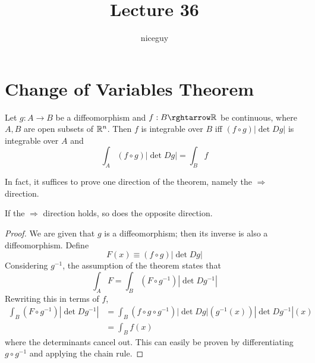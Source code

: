 \documentclass[12pt]{article}
\author{niceguy}
\title{Lecture 36}
\begin{document}
\maketitle

\section{Change of Variables Theorem}

Let $g:A \rightarrow B$ be a diffeomorphism and $f:B \rghtarrow \R$ be continuous, where $A, B$ are open subsets of $\mathbb{R}^n$. Then $f$ is integrable over $B$ iff $(f\circ g) |\det Dg|$ is integrable over $A$ and
$$\int_A (f\circ g) |\det Dg| = \int_B f$$

In fact, it suffices to prove one direction of the theorem, namely the $\Rightarrow$ direction.

\begin{thm}
    If the $\Rightarrow$ direction holds, so does the opposite direction.
\end{thm}

\begin{proof}
    We are given that $g$ is a diffeomorphism; then its inverse is also a diffeomorphism. Define
    $$F(x) \equiv (f\circ g)|\det Dg|$$
    Considering $g^{-1}$, the assumption of the theorem states that
    $$\int_A F = \int_B \left(F\circ g^{-1}\right) |\det Dg^{-1}|$$
    Rewriting this in terms of $f$,
    \begin{align*}
        \int_B \left(F\circ g^{-1}\right) |\det Dg^{-1}| &= \int_B \left(f\circ g \circ g^{-1}\right) |\det Dg|\left(g^{-1}(x)\right) |\det Dg^{-1}|(x) \\
                                                         &= \int_B f(x)
    \end{align*}
    where the determinants cancel out. This can easily be proven by differentiating $g\circ g^{-1}$ and applying the chain rule.
\end{proof}
\end{document}
